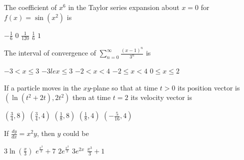\begin{questions}
\question[2] The coefficient of $x^6$ in the Taylor series expansion
    about $x = 0$ for $f(x) = \sin (x^2)$ is

    \begin{oneparchoices}
    \CorrectChoice $-\frac{1}{6}$
    \choice $0$
    \choice $\frac{1}{120}$
    \choice $\frac{1}{6}$
    \choice $1$
    \end{oneparchoices}

\question[2] The interval of convergence of $\sum_{n =
    0}^\infty \frac{ (x-1)^n }{3^n}$ is

    \begin{oneparchoices}
    \choice $-3 < x \le 3$
    \choice $-3 le x \le 3$
    \CorrectChoice $-2 < x < 4$
    \choice $-2 \le x < 4$
    \choice $0 \le x \le 2$
    \end{oneparchoices}

\question[2] If a particle moves in the $xy$-plane so that at time $t
    > 0$ its position vector is $(\ln(t^2 + 2t), 2t^2)$ then at time
      $t = 2$ its velocity vector is

    \begin{oneparchoices}
    \CorrectChoice $(\frac{3}{4}, 8)$
    \choice $(\frac{3}{4}, 4)$
    \choice $(\frac{1}{8}, 8)$
    \choice $(\frac{1}{8}, 4)$
    \choice $(-\frac{5}{16}, 4)$
    \end{oneparchoices}

\question[2] If $\frac{dy}{dx} = x^2y$, then $y$ could be

    \begin{oneparchoices}
    \choice $3\ln(\frac{x}{3})$
    \choice $e^\frac{x^3}{3} + 7$
    \CorrectChoice $2e^\frac{x^3}{3}$
    \choice $3e^{2x}$
    \choice $\frac{x^3}{3} + 1$
    \end{oneparchoices}
\end{questions}

